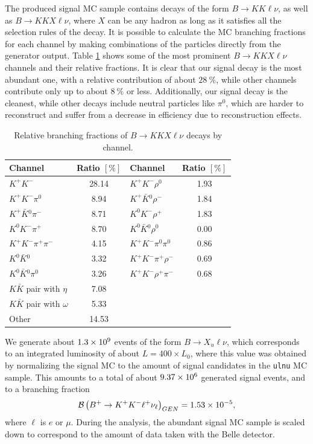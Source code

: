 The produced signal MC sample contains decays of the form $B \to KK\ell \nu$, as well as $B \to KKX\ell \nu$, where $X$ can be any hadron as long as it satisfies all the selection rules of the decay. It is possible to calculate the MC branching fractions for each channel by making combinations of the particles directly from the generator output. Table \ref{tab:KKX} shows some of the most prominent $B \to KKX\ell \nu$ channels and their relative fractions. It is clear that our signal decay is the most abundant one, with a relative contribution of about $28~\%$, while other channels contribute only up to about $8~\%$ or less. Additionally, our signal decay is the cleanest, while other decays include neutral particles like $\pi^0$, which are harder to reconstruct and suffer from a decrease in efficiency due to reconstruction effects.
\begin{table}[H]
	\centering
	\begin{tabular}{l|c||l|c}
		Channel & Ratio $[\%]$ & Channel & Ratio $[\%]$ \\
		\toprule 
		$K^+ K^-$ & 28.14 & $K^+ K^- \rho^0$ & 1.93 \\
		$K^+ K^- \pi^0$ & 8.94 & $K^+ \bar{K}{}^0 \rho^-$ & 1.84 \\
		$K^+ \bar{K}{}^0 \pi^-$ & 8.71 & $K^0 K^- \rho^+$ & 1.83 \\
		$K^0 K^- \pi^+$ & 8.70 & $K^0 \bar K {}^0 \rho^0$ & 0.00 \\
		$K^+ K^- \pi^+ \pi^-$ & 4.15 &  $K^+ K^- \pi^0 \pi^0$ & 0.86 \\
		$K^0 \bar K {}^0$ & 3.32  & $K^+ K^- \pi^+ \rho^-$ & 0.69 \\
		$K^0 \bar K {}^0 \pi^0$ & 3.26 & $K^+ K^- \rho^+ \pi^-$ & 0.68 \\
		\midrule
		$K \bar K$ pair with $\eta$ & 7.08  & & \\
		$K \bar K$ pair with $\omega$ & 5.33  & & \\
		Other & 14.53  & & \\
		\bottomrule 
	\end{tabular}
	\captionsetup{width=.8\linewidth}
	\caption{Relative branching fractions of $B \to KKX\ell \nu$ decays by channel.}
	\label{tab:KKX}
\end{table}

We generate about $1.3\times 10^{9}$ events of the form $B\to X_u \ell \nu$, which corresponds to an integrated luminosity of about $L = 400\times L_0$, where this value was obtained by normalizing the signal MC to the amount of signal candidates in the \texttt{ulnu} MC sample. This amounts to a total of about $9.37\times 10^{6}$ generated signal events, and to a branching fraction
\begin{equation}
\mathcal{B}\left(B^+ \to K^+ K^- \ell^+ \nu_\ell\right)_{GEN} = 1.53\times 10^{-5},
\end{equation}
where $\ell$ is $e$ or $\mu$. During the analysis, the abundant signal MC sample is scaled down to correspond to the amount of data taken with the Belle detector.

